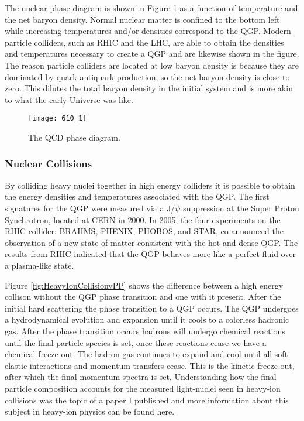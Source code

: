 The nuclear phase diagram is shown in Figure \ref{fig:QCDphase} as a function of temperature and the net baryon density.  Normal nuclear matter is confined to the bottom left while increasing temperatures and/or densities correspond to the QGP.  Modern particle colliders, such as RHIC and the LHC, are able to obtain the densities and temperatures necessary to create a QGP and are likewise shown in the figure.  The reason particle colliders are located at low baryon density is because they are dominated by quark-antiquark production, so the net baryon density is close to zero.  This dilutes the total baryon density in the initial system and is more akin to what the early Universe was like.  

\begin{figure}[h]
\texttt{[image: 610\_1]}
\centering
\caption{The QCD phase diagram\cite{Mohanty:2013yca}.}
\label{fig:QCDphase}
\end{figure}

\subsubsection{Nuclear Collisions}
By colliding heavy nuclei together in high energy colliders it is possible to obtain the energy densities and temperatures associated with the QGP.  The first signatures for the QGP were measured via a J/$\psi$ suppression at the Super Proton Synchrotron, located at CERN in 2000\cite{Csorgo:2000yu}.  In 2005, the four experiments on the RHIC collider: BRAHMS\cite{Arsene:2004fa}, PHENIX\cite{Adcox2005184}, PHOBOS\cite{Back200528}, and STAR\cite{Adams2005102}, co-announced the observation of a new state of matter consistent with the hot and dense QGP.  The results from RHIC indicated that the QGP behaves more like a perfect fluid over a plasma-like state\cite{Jacak310}.

Figure \ref{fig:HeavyIonCollisionvPP} shows the difference between a high energy collison without the QGP phase transition and one with it present.  After the initial hard scattering the phase transition to a QGP occurs.  The QGP undergoes a hydrodynamical evolution and expansion until it cools to a colorless hadronic gas.  After the phase transition occurs  hadrons will undergo chemical reactions until the final particle species is set, once these reactions cease we have a chemical freeze-out. The hadron gas continues to expand and cool until all soft elastic interactions and momentum transfers cease.  This is the kinetic freeze-out, after which the final momentum spectra is set.  Understanding how the final particle composition accounts for the measured light-nuclei seen in heavy-ion collisions was the topic of a paper I published and more information about this subject in heavy-ion physics can be found here\cite{Sharma:2018dyb}.

